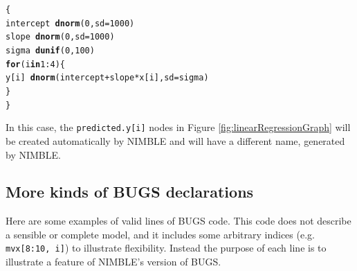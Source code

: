 \documentclass[12pt,oneside]{book}\usepackage[]{graphicx}\usepackage[]{color}
\makeatletter
\newcommand{\hlnum}[1]{\textcolor[rgb]{0.686,0.059,0.569}{#1}}%
\newcommand{\hlopt}[1]{\textcolor[rgb]{0,0,0}{#1}}%
\newcommand{\hlstd}[1]{\textcolor[rgb]{0.345,0.345,0.345}{#1}}%
\newcommand{\hlkwa}[1]{\textcolor[rgb]{0.161,0.373,0.58}{\textbf{#1}}}%
\newcommand{\hlkwc}[1]{\textcolor[rgb]{0.333,0.667,0.333}{#1}}%
\newcommand{\hlkwd}[1]{\textcolor[rgb]{0.737,0.353,0.396}{\textbf{#1}}}%
\newenvironment{kframe}{%
 \def\at@end@of@kframe{}%
 \ifinner\ifhmode%
  \def\at@end@of@kframe{\end{minipage}}%
  \begin{minipage}{\columnwidth}%
 \fi\fi%
 \def\FrameCommand##1{\hskip\@totalleftmargin \hskip-\fboxsep
 \colorbox{shadecolor}{##1}\hskip-\fboxsep
     \hskip-\linewidth \hskip-\@totalleftmargin \hskip\columnwidth}%
 \MakeFramed {\advance\hsize-\width
   \@totalleftmargin\z@ \linewidth\hsize
   \@setminipage}}%
 {\par\unskip\endMakeFramed%
 \at@end@of@kframe}
\newenvironment{knitrout}{}{} %
\def\cd#1{\texttt{#1}}
\makeatother
\begin{document}
\begin{knitrout}
\color{fgcolor}\begin{kframe}
\begin{alltt}
\hlstd{\{}
    \hlstd{intercept} \hlopt{~} \hlkwd{dnorm}\hlstd{(}\hlnum{0}\hlstd{,} \hlkwc{sd} \hlstd{=} \hlnum{1000}\hlstd{)}
    \hlstd{slope} \hlopt{~} \hlkwd{dnorm}\hlstd{(}\hlnum{0}\hlstd{,} \hlkwc{sd} \hlstd{=} \hlnum{1000}\hlstd{)}
    \hlstd{sigma} \hlopt{~} \hlkwd{dunif}\hlstd{(}\hlnum{0}\hlstd{,} \hlnum{100}\hlstd{)}
    \hlkwa{for}\hlstd{(i} \hlkwa{in} \hlnum{1}\hlopt{:}\hlnum{4}\hlstd{) \{}
        \hlstd{y[i]} \hlopt{~} \hlkwd{dnorm}\hlstd{(intercept} \hlopt{+} \hlstd{slope} \hlopt{*} \hlstd{x[i],} \hlkwc{sd} \hlstd{= sigma)}
    \hlstd{\}}
\hlstd{\}}
\end{alltt}
\end{kframe}
\end{knitrout}

In this case, the \cd{predicted.y[i]} nodes in Figure
\ref{fig:linearRegressionGraph} will be created automatically by
NIMBLE and will have a different name, generated by NIMBLE.

\subsection{More kinds of BUGS declarations}
\label{sec:more-kinds-bugs}

Here are some examples of valid lines of BUGS code.  This code does
not describe a sensible or complete model, and it includes some
arbitrary indices (e.g. \cd{mvx[8:10, i]}) to illustrate flexibility.
Instead the purpose of each line is to illustrate a feature of
NIMBLE's version of BUGS.
\end{document}
